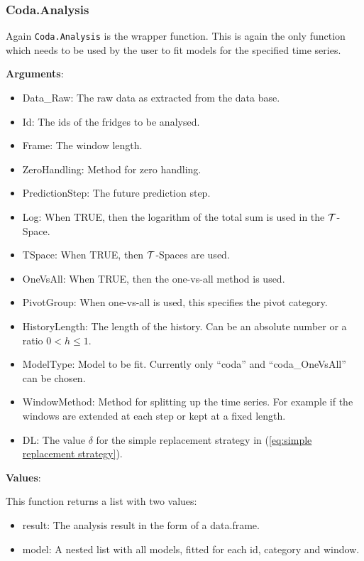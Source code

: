 \subsubsection{Coda.Analysis}
\label{sec:Coda.Analysis}

Again \texttt{Coda.Analysis} is the wrapper function. This is again the only function which needs to be used by the user to fit models for the specified time series.

\textbf{Arguments}:

\begin{itemize}
	\item Data\_Raw: The raw data as extracted from the data base.
	\item Id: The ids of the fridges to be analysed.
	\item Frame: The window length.
	\item ZeroHandling: Method for zero handling. 
	\item PredictionStep: The future prediction step. 
	\item Log: When TRUE, then the logarithm of the total sum is used in the $\mathcal{T}$-Space.
	\item TSpace: When TRUE, then $\mathcal{T}$-Spaces are used. 
	\item OneVsAll: When TRUE, then the one-vs-all method is used. 
	\item PivotGroup: When one-vs-all is used, this specifies the pivot category.
	\item HistoryLength: The length of the history. Can be an absolute number or a ratio $0<h\leq 1$. 
	\item ModelType: Model to be fit. Currently only ``coda'' and ``coda\_OneVsAll'' can be chosen.
	\item WindowMethod: Method for splitting up the time series. For example if the windows are extended at each step or kept at a fixed length.
	\item DL: The value $\delta$ for the simple replacement strategy in (\ref{eq:simple replacement strategy}). 
\end{itemize}

\textbf{Values}:

This function returns a list with two values:

\begin{itemize}
	\item result: The analysis result in the form of a data.frame. 
	\item model: A nested list with all models, fitted for each id, category and window.
\end{itemize}


